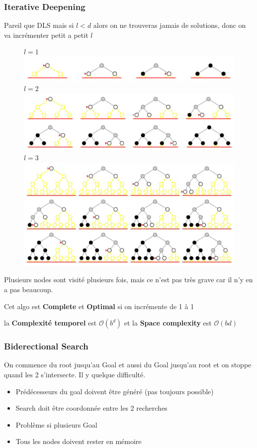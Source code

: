 		\subsubsection{Iterative Deepening}		
		  Pareil que DLS mais si $l < d$ alors on ne trouveras jamais de solutions, donc on va incrémenter petit a petit $l$
			\begin{figure}[htp]
				\centering
				$l = 1$
				\includegraphics[width=\textwidth]{img/DLS1.png}
				$l = 2$
				\includegraphics[width=\textwidth]{img/DLS2.png}
				$l = 3$
				\includegraphics[width=\textwidth]{img/DLS3.png}

			\end{figure}
			
		Plusieurs nodes sont visité plusieurs fois, mais ce n'est pas très grave car il n'y en a pas beaucoup.
		
		Cet algo est \textbf{Complete} et \textbf{Optimal} si on incrémente de 1 à 1
		
		la \textbf{Complexité temporel} est $\mathcal{O}(b^d)$ et la \textbf{Space complexity} est $\mathcal{O}(bd)$
		
		
		\subsubsection{Biderectional Search}
			On commence du root jusqu'au Goal et aussi du Goal jusqu'au root et on stoppe quand les 2 s'intersecte. Il y quelque difficulté.
			\begin{itemize}
				\item Prédécesseurs du goal doivent être généré (pas toujours possible)
				\item Search doit être coordonnée entre les 2 recherches
				\item Problème si plusieurs Goal
				\item Tous les nodes doivent rester en mémoire
			\end{itemize}
			
